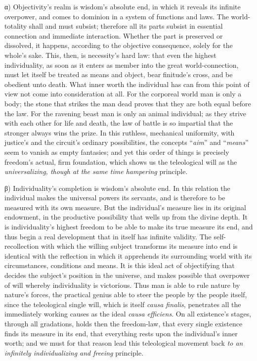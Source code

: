 \documentclass[12pt]{book}
\begin{document}
α) Objectivity's realm is wisdom's absolute end, in which it reveals its
infinite overpower, and comes to dominion in a system of functions and laws.
The world-totality shall and must subsist; therefore all its parts subsist
in essential connection and immediate interaction. Whether the part is
preserved or dissolved, it happens, according to the objective consequence,
solely for the whole's sake. This, then, is necessity's hard law: that even
the highest individuality, as soon as it enters as member into the great
world-connection, must let itself be treated as means and object, bear
finitude's cross, and be obedient unto death. What inner worth the
individual has can from this point of view not come into consideration at
all. For the corporeal world man is only a body; the stone that strikes the
man dead proves that they are both equal before the law. For the ravening
beast man is only an animal individual; as they strive with each other for
life and death, the law of battle is so impartial that the stronger always
wins the prize. In this ruthless, mechanical uniformity, with justice's and
the circuit's ordinary possibilities, the concepts ``\emph{aim}'' and
``\emph{means}'' seem to vanish as empty fantasies; and yet this order of
things is precisely freedom's actual, firm foundation, which shows us the
teleological will as the \emph{universalizing, though at the same time
hampering} principle.

β) Individuality's completion is wisdom's absolute end. In this relation the
individual makes the universal powers its servants, and is therefore to be
measured with its own measure. But the individual's measure lies in its
original endowment, in the productive possibility that wells up from the
divine depth. It is individuality's highest freedom to be able to make its
true measure its end, and thus begin a real development that in itself has
infinite validity. The self-recollection with which the willing subject
transforms its measure into end is identical with the reflection in which it
apprehends its surrounding world with its circumstances, conditions and
means. It is this ideal act of objectifying that decides the subject's
position in the universe, and makes possible that overpower of will whereby
individuality is victorious. Thus man is able to rule nature by nature's
forces, the practical genius able to steer the people by the people itself,
since the teleological single will, which is itself \textit{causa finalis},
penetrates all the immediately working causes as the ideal \textit{causa
efficiens}. On all existence's stages, through all gradations, holds then
the freedom-law, that every single existence finds its measure in its end,
that everything rests upon the individual's inner worth; and we must for
that reason lead this teleological movement back \emph{to an infinitely
individualizing and freeing} principle.
\end{document}
